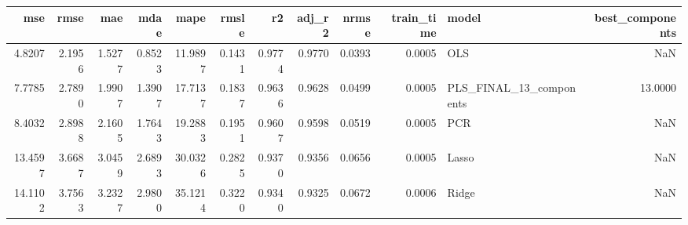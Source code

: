 \begin{tabular}{rrrrrrrrrrlr}
\toprule
mse & rmse & mae & mdae & mape & rmsle & r2 & adj_r2 & nrmse & train_time & model & best_components \\
\midrule
4.8207 & 2.1956 & 1.5277 & 0.8523 & 11.9897 & 0.1431 & 0.9774 & 0.9770 & 0.0393 & 0.0005 & OLS & NaN \\
7.7785 & 2.7890 & 1.9907 & 1.3907 & 17.7137 & 0.1837 & 0.9636 & 0.9628 & 0.0499 & 0.0005 & PLS_FINAL_13_components & 13.0000 \\
8.4032 & 2.8988 & 2.1605 & 1.7643 & 19.2883 & 0.1951 & 0.9607 & 0.9598 & 0.0519 & 0.0005 & PCR & NaN \\
13.4597 & 3.6687 & 3.0459 & 2.6893 & 30.0326 & 0.2825 & 0.9370 & 0.9356 & 0.0656 & 0.0005 & Lasso & NaN \\
14.1102 & 3.7563 & 3.2327 & 2.9800 & 35.1214 & 0.3220 & 0.9340 & 0.9325 & 0.0672 & 0.0006 & Ridge & NaN \\
\bottomrule
\end{tabular}

